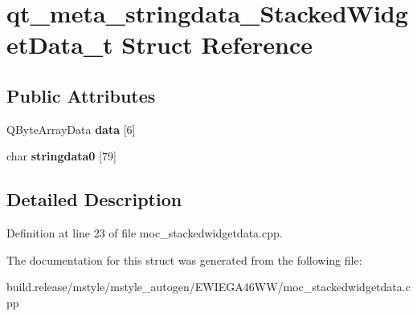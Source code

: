 \hypertarget{structqt__meta__stringdata___stacked_widget_data__t}{}\section{qt\+\_\+meta\+\_\+stringdata\+\_\+\+Stacked\+Widget\+Data\+\_\+t Struct Reference}
\label{structqt__meta__stringdata___stacked_widget_data__t}
\subsection*{Public Attributes}
\begin{DoxyCompactItemize}
\item 
\mbox{\label{structqt__meta__stringdata___stacked_widget_data__t_acefbabd4d0d93dcf7f09015c08060506}} 
Q\+Byte\+Array\+Data {\bfseries data} \mbox{[}6\mbox{]}
\item 
\mbox{\label{structqt__meta__stringdata___stacked_widget_data__t_a32e03c08a2be8f1be70605b37a589f68}} 
char {\bfseries stringdata0} \mbox{[}79\mbox{]}
\end{DoxyCompactItemize}


\subsection{Detailed Description}


Definition at line 23 of file moc\+\_\+stackedwidgetdata.\+cpp.



The documentation for this struct was generated from the following file\+:\begin{DoxyCompactItemize}
\item 
build.\+release/mstyle/mstyle\+\_\+autogen/\+E\+W\+I\+E\+G\+A46\+W\+W/moc\+\_\+stackedwidgetdata.\+cpp\end{DoxyCompactItemize}
